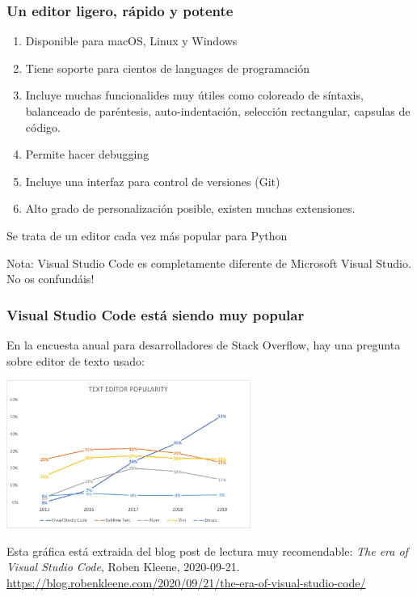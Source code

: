 \documentclass[9pt]{beamer}
\begin{document}
\begin{frame}
  \frametitle{Un editor ligero, rápido y potente}
  \begin{enumerate}
  \item Disponible para  macOS, Linux y Windows
  \item Tiene soporte para cientos de languages de programación
  \item Incluye muchas funcionalides muy útiles como  coloreado de síntaxis,
    balanceado de paréntesis, auto-indentación, selección rectangular,
    capsulas de código.
  \item Permite hacer debugging
  \item Incluye una interfaz para control de versiones (Git)
    
  \item Alto grado de personalización posible, existen muchas extensiones.
  \end{enumerate}
  \pause
  \begin{block}
    
    \begin{center} 
    Se trata de un editor cada vez más popular para Python
    \end{center}
  \end{block}\pause
  \begin{block}{Nota:}
    Visual Studio Code es completamente diferente de  Microsoft Visual
    Studio. No os confundáis!
  \end{block}
\end{frame}
\begin{frame}
  \frametitle{Visual Studio Code está siendo muy popular}
  En la encuesta anual para desarrolladores de  Stack Overflow, hay
  una pregunta sobre editor de texto usado: 
  \begin{center}
    \includegraphics[width=8cm]{2020-09-20-text-editor-popularity}
  \end{center}
  Esta gráfica está extraida del blog post de lectura muy recomendable:
  \textit{The era of Visual Studio Code}, Roben Kleene, 2020-09-21. \href{https://blog.robenkleene.com/2020/09/21/the-era-of-visual-studio-code/}{https://blog.robenkleene.com/2020/09/21/the-era-of-visual-studio-code/}
\end{frame}
\end{document}
